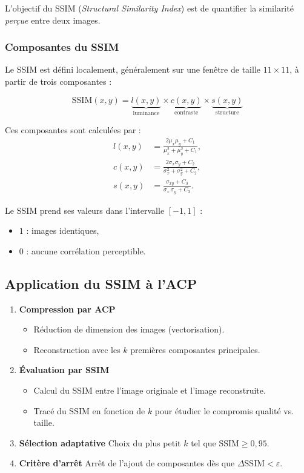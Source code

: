\documentclass[a4paper,12pt]{report}
\begin{document}
L’objectif du SSIM (\textit{Structural Similarity Index}) est de quantifier la similarité \emph{perçue} entre deux images.

\subsubsection*{Composantes du SSIM}

Le SSIM est défini localement, généralement sur une fenêtre de taille $11 \times 11$, à partir de trois composantes :

\begin{equation}
  \mathrm{SSIM}(x,y) = 
  \underbrace{l(x,y)}_{\text{luminance}} \times 
  \underbrace{c(x,y)}_{\text{contraste}} \times 
  \underbrace{s(x,y)}_{\text{structure}}
\end{equation}

Ces composantes sont calculées par :
\begin{align}
  l(x,y) &= \frac{2\mu_x\mu_y + C_1}{\mu_x^2 + \mu_y^2 + C_1}, \\
  c(x,y) &= \frac{2\sigma_x\sigma_y + C_2}{\sigma_x^2 + \sigma_y^2 + C_2}, \\
  s(x,y) &= \frac{\sigma_{xy} + C_3}{\sigma_x\,\sigma_y + C_3}.
\end{align}

Le SSIM prend ses valeurs dans l’intervalle $[-1,1]$ :
\begin{itemize}
  \item $1$ : images identiques,
  \item $0$ : aucune corrélation perceptible.
\end{itemize}

\subsection*{Application du SSIM à l’ACP}

\begin{enumerate}
  \item \textbf{Compression par ACP}
    \begin{itemize}
      \item Réduction de dimension des images (vectorisation).
      \item Reconstruction avec les $k$ premières composantes principales.
    \end{itemize}

  \item \textbf{Évaluation par SSIM}
    \begin{itemize}
      \item Calcul du SSIM entre l’image originale et l’image reconstruite.
      \item Tracé du SSIM en fonction de $k$ pour étudier le compromis qualité vs. taille.
    \end{itemize}

  \item \textbf{Sélection adaptative}  
    Choix du plus petit $k$ tel que $\mathrm{SSIM}\ge0{,}95$.

  \item \textbf{Critère d’arrêt}  
    Arrêt de l’ajout de composantes dès que $\Delta \mathrm{SSIM} < \varepsilon$.
\end{enumerate}
\end{document}
